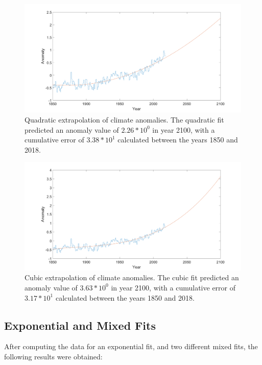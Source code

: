 \documentclass[11pt]{article}
\begin{document}
\begin{figure}[H]
    \centering
    \includegraphics[width=\textwidth]{quadratic.png}
    \caption{Quadratic extrapolation of climate anomalies. The quadratic fit predicted an anomaly value of $2.26*10^{0}$ in year 2100, with a cumulative error of $3.38*10^{1}$ calculated between the years 1850 and 2018.}
    \label{fig:quadratic}
\end{figure}

\begin{figure}[H]
    \centering
    \includegraphics[width=\textwidth]{cubic.png}
    \caption{Cubic extrapolation of climate anomalies. The cubic fit predicted an anomaly value of $3.63*10^{0}$ in year 2100, with a cumulative error of $3.17*10^{1}$ calculated between the years 1850 and 2018.}
    \label{fig:cubic}
\end{figure}

\subsection{ Exponential and Mixed Fits}
After computing the data for an exponential fit, and two different mixed fits, the following results were obtained:
\end{document}
